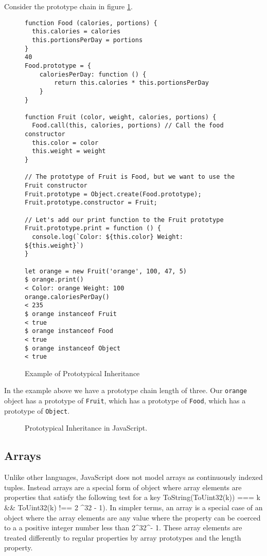 \documentclass[]{final_report}
\begin{document}
Consider the prototype chain in figure \ref{fig:js-prototypical-inheritance}.

\begin{figure}[h]
\begin{verbatim}
function Food (calories, portions) {
  this.calories = calories
  this.portionsPerDay = portions
}
40
Food.prototype = {
	caloriesPerDay: function () {
		return this.calories * this.portionsPerDay
	}
}

function Fruit (color, weight, calories, portions) {
  Food.call(this, calories, portions) // Call the food constructor
  this.color = color
  this.weight = weight
}

// The prototype of Fruit is Food, but we want to use the Fruit constructor
Fruit.prototype = Object.create(Food.prototype);
Fruit.prototype.constructor = Fruit;

// Let's add our print function to the Fruit prototype
Fruit.prototype.print = function () {
  console.log(`Color: ${this.color} Weight: ${this.weight}`)
}

let orange = new Fruit('orange', 100, 47, 5)
$ orange.print()
< Color: orange Weight: 100
orange.caloriesPerDay()
< 235
$ orange instanceof Fruit
< true
$ orange instanceof Food
< true
$ orange instanceof Object
< true
\end{verbatim}
\caption{\label{fig:js-prototypical-inheritance} Example of Prototypical Inheritance}
\end{figure} 

In the example above we have a prototype chain length of three. Our \lstinline{orange} object has a prototype of \lstinline{Fruit}, which has a prototype of \lstinline{Food}, which has a prototype of \lstinline{Object}.

\begin{figure}[h]
\centering
\fboxsep 2mm
\caption{\label{fig:logo} Prototypical Inheritance in JavaScript.}
\end{figure} 

\subsection{Arrays}
Unlike other languages, JavaScript does not model arrays as continuously indexed tuples. Instead arrays are  a special form of object where array elements are properties that satisfy the following test for a key ToString(ToUint32(k)) === k \&\& ToUint32(k) !== 2 \textasciicircum 32 - 1). In simpler terms, an array is a special case of an object where the array elements are any value where the property can be coerced to a a positive integer number less than 2\textasciicircum32\textasciicircum - 1. These array elements are treated differently to regular properties by array prototypes and the length property. 
\end{document}
